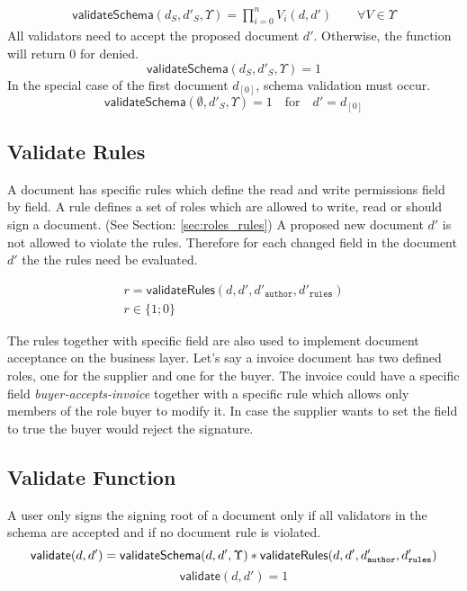 \begin{equation}
\begin{split}
   \mathsf{validateSchema}(d_S,d'_S,\Upsilon) =\prod_{i=0}^{n} V_i(d, d')  \qquad \forall V \in \Upsilon
    \end{split}
\end{equation}
All validators need to accept the proposed document $d'$. Otherwise, the function will return $0$ for denied.
\begin{equation}
  \mathsf{validateSchema}(d_S,d'_S,\Upsilon) = 1
\end{equation}
 In the special case of the first document $d_{[0]}$, schema validation must occur.
\begin{equation}
  \mathsf{validateSchema}(\emptyset, d'_S,\Upsilon) = 1 \quad \text{for} \quad  d' = d_{[0]}
\end{equation}

\subsection{Validate Rules}
A document has specific rules which define the read and write permissions field by field. A rule defines a set of roles which are allowed to write, read or should sign a document. (See Section:  \ref{sec:roles_rules}) A proposed new document $d'$ is not allowed to violate the rules. Therefore for each changed field in the document $d'$ the the rules need be evaluated.

\begin{equation}
 \begin{split}
  r = \mathsf{validateRules}(d,d',d'_{\mathtt{author}},d'_{\mathtt{rules}}) \\
  r \in \{1;0\}
 \end{split}
\end{equation}

The rules together with specific field are also used to implement document acceptance on the business layer. Let's say a invoice document has two defined roles, one for the supplier and one for the buyer. The invoice could have a specific field \textit{buyer-accepts-invoice} together with a specific rule which allows only members of the role buyer to modify it. In case the supplier wants to set the field to true the buyer would reject the signature. 

\subsection{Validate Function}
A user only signs the signing root of a document  only if all validators in the schema are accepted and if no document rule is violated.
\begin{equation}
 \mathsf{validate}(d,d') =\mathsf{validateSchema}(d,d',\Upsilon) * \mathsf{validateRules}(d,d',d'_{\mathtt{author}},d'_{\mathtt{rules}}) \\
 \end{equation}
    \begin{equation}
 \mathsf{validate}(d,d') = 1
 \end{equation}

